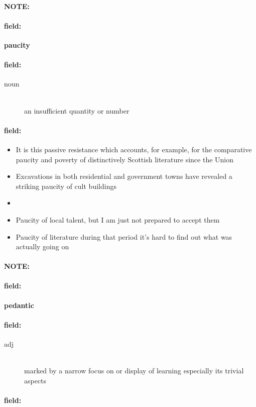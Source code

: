 \documentclass[12pt]{article}
\newenvironment{note}{\paragraph{NOTE:}}{}
\newenvironment{field}{\paragraph{field:}}{}
\begin{document}
\begin{note}
\begin{field}
\textbf{\large paucity}
\end{field}


\begin{field}
\begin{description}
\item[noun] \hfill \\ 
an insufficient quantity or number

\end{description}
\end{field}

\begin{field}
\begin{itemize}
\item It is this passive resistance which accounts, for example, for the comparative paucity and poverty of distinctively Scottish literature since the Union
\item Excavations in both residential and government towns have revealed a striking paucity of cult buildings
\item 
\item Paucity of local talent, but I am just not prepared to accept them
\item Paucity of literature during that period it's hard to find out what was actually going on
\end{itemize}
\end{field}
\end{note}
\begin{note}
\begin{field}
\textbf{\large pedantic}
\end{field}


\begin{field}
\begin{description}
\item[adj] \hfill \\ 
marked by a narrow focus on or display of learning especially its trivial aspects

\end{description}
\end{field}

\begin{field}
\end{field}
\end{note}
\end{document}
